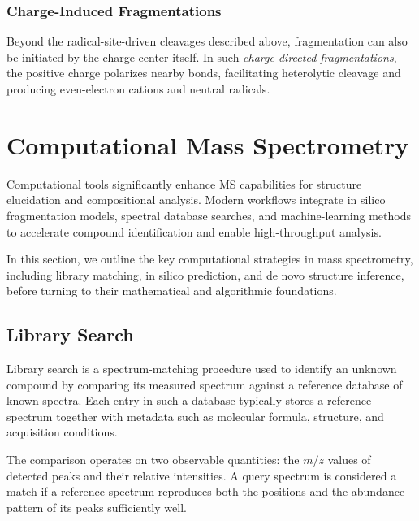 \subsubsection{Charge-Induced Fragmentations}

Beyond the radical-site-driven cleavages described above, fragmentation can also be initiated by the charge center itself.
In such \emph{charge-directed fragmentations}, the positive charge polarizes nearby bonds, facilitating heterolytic cleavage and producing even-electron cations and neutral radicals. 
\cite[pp.~281]{Hoffmann2011}


\section{Computational Mass Spectrometry}

Computational tools significantly enhance MS capabilities for structure elucidation and compositional analysis. \cite[pp.~1--2]{Scheubert2013}
Modern workflows integrate in silico fragmentation models, spectral database searches, and machine-learning methods to accelerate compound identification and enable high-throughput analysis. \cite[p.~1]{Ashyrmamatov2025} \cite[p.~2]{Scheubert2013}

In this section, we outline the key computational strategies in mass spectrometry, including library matching, in silico prediction, and de novo structure inference, before turning to their mathematical and algorithmic foundations.

\subsection{Library Search}
Library search is a spectrum-matching procedure used to identify an unknown compound by comparing its measured spectrum against a reference database of known spectra. \cite[p.~8]{Scheubert2013}
Each entry in such a database typically stores a reference spectrum together with metadata such as molecular formula, structure, and acquisition conditions.

The comparison operates on two observable quantities:
the $m/z$ values of detected peaks and their relative intensities.
A query spectrum is considered a match if a reference spectrum reproduces both the positions and the abundance pattern of its peaks sufficiently well.\cite[p.~35]{Rockwood2018}


